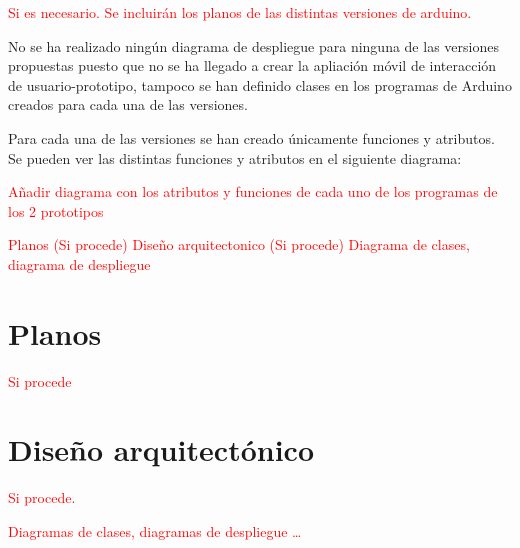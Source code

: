 
\textcolor{red}{Si es necesario.
Se incluirán los planos de las distintas versiones de arduino.}

No se ha realizado ningún diagrama de despliegue para ninguna de las versiones propuestas puesto que no se ha llegado a crear la apliación móvil de interacción de usuario-prototipo, tampoco se han definido clases en los programas de Arduino\cite{ArduinoIDE} creados para cada una de las versiones. 

Para cada una de las versiones se han creado únicamente funciones y atributos. Se pueden ver las distintas funciones y atributos en el siguiente diagrama:

\textcolor{red}{Añadir diagrama con los atributos y funciones de cada uno de los programas de los 2 prototipos}


\textcolor{red}{
    Planos (Si procede)
    Diseño arquitectonico (Si procede)
        Diagrama de clases, diagrama de despliegue}

\section{Planos}

\textcolor{red}{Si procede}

\section{Diseño arquitectónico}

\textcolor{red}{Si procede.}

\textcolor{red}{Diagramas de clases, diagramas de despliegue \ldots}

